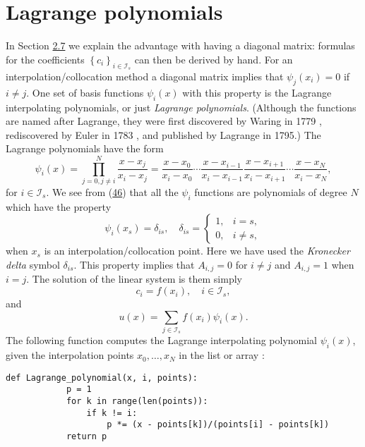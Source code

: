 \documentclass[../main.tex]{subfiles}
\begin{document}
	\section[Lagrange polynomials]{Lagrange polynomials}
	\label{sec:sec_2_11}
	\noindent In Section \hyperref[sec:sec_2_7]{2.7} we explain the advantage with having a diagonal matrix: formulas for the coefficients $\left\{c_{i}\right\}_{i \in \mathcal{I}_{s}}$ can then be derived by hand. For an interpolation/collocation method a diagonal matrix implies that $\psi_{j}\left(x_{i}\right)=0$ if $i \neq j$. One set of basis functions $\psi_{i}(x)$ with this property is the Lagrange interpolating polynomials, or just \textit{Lagrange polynomials}. (Although the functions are named after Lagrange, they were first discovered by Waring in 1779 , rediscovered by
	Euler in 1783 , and published by Lagrange in 1795.) The Lagrange polynomials have the form
	\begin{equation}\label{eqa46}
		\psi_{i}(x)=\prod_{j=0, j \neq i}^{N} \frac{x-x_{j}}{x_{i}-x_{j}}=\frac{x-x_{0}}{x_{i}-x_{0}} \cdots \frac{x-x_{i-1}}{x_{i}-x_{i-1}} \frac{x-x_{i+1}}{x_{i}-x_{i+1}} \cdots \frac{x-x_{N}}{x_{i}-x_{N}},
	\end{equation}
	for $i \in \mathcal{I}_{s}$. We see from (\hyperref[eqa46]{46}) that all the $\psi_{i}$ functions are polynomials of degree $N$ which have the property
	\begin{equation}\label{eqa47}
		\psi_{i}\left(x_{s}\right)=\delta_{i s}, \quad \delta_{i s}= \begin{cases}1, & i=s, \\ 0, & i \neq s,\end{cases}
	\end{equation}
	when $x_{s}$ is an interpolation/collocation point. Here we have used the \textit{Kronecker delta} symbol $\delta_{i s}$. This property implies that $A_{i, j}=0$ for $i \neq j$ and $A_{i, j}=1$ when $i=j$. The solution of the linear system is them simply
	\begin{equation}\label{eqa48}
		c_{i}=f\left(x_{i}\right), \quad i \in \mathcal{I}_{s},
	\end{equation}
	and
	\begin{equation}\label{eqa49}
		u(x)=\sum_{j \in \mathcal{I}_{s}} f\left(x_{i}\right) \psi_{i}(x).
	\end{equation}
	The following function computes the Lagrange interpolating polynomial $\psi_{i}(x)$, given the interpolation points $x_{0}, \ldots, x_{N}$ in the list or array :
	\begin{lstlisting}[numbers=none]
		def Lagrange_polynomial(x, i, points):
			p = 1
			for k in range(len(points)):
				if k != i:
					p *= (x - points[k])/(points[i] - points[k])
			return p
	\end{lstlisting}
\end{document}
